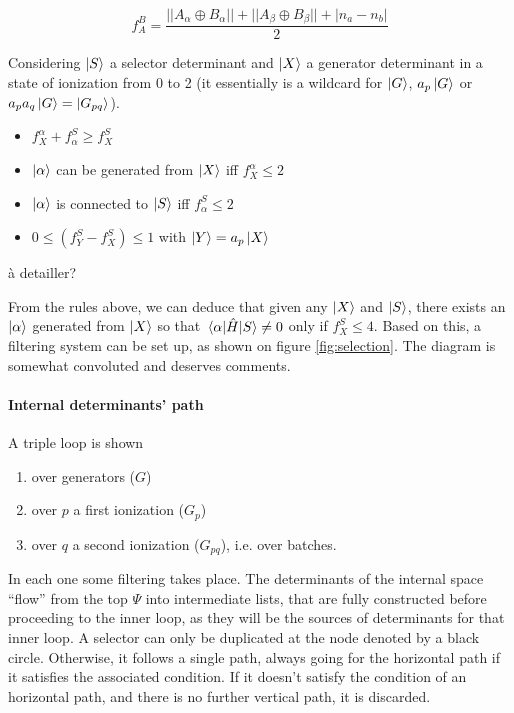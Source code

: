 \documentclass[./thesis.tex]{subfiles}
\begin{document}
\begin{equation}
f_A^B = \frac{||A_\alpha \oplus B_\alpha|| + ||A_\beta \oplus B_\beta|| + |n_a-n_b|}{2}
\end{equation}


Considering $\ket S$ a selector determinant and $\ket X$ a generator determinant in a state of ionization from 0 to 2 (it essentially is a wildcard for $\ket G$, $a_{p} \ket G$ or $a_{p} a_{q} \ket G = \ket {G_{pq}}$).

\begin{itemize}
\item
$f_X^\alpha + f_\alpha^S \geq f_X^S$
\item
$\ket \alpha$ can be generated from $\ket X$ iff $f_X^\alpha \leq 2$
\item
$\ket \alpha$ is connected to $\ket S$ iff $f_\alpha^S \leq 2$
\item
$0 \leq (f_Y^S - f_X^S) \leq 1$ with $\ket Y = a_p \ket X$
\end{itemize}

\alert{à detailler?}

From the rules above, we can deduce that given any $\ket X$ and $\ket S$, there exists an ${\ket{\alpha}}$ generated from $\ket X$ so that $\mel{\alpha}{\hat{H}}{S} \neq 0$ only if $f_X^S \leq 4$.
Based on this, a filtering system can be set up, as shown on figure \ref{fig:selection}. The diagram is somewhat convoluted and deserves comments.

\paragraph{Internal determinants' path}
 
A triple loop is shown

\begin{enumerate}
\item
over generators ($G$)
\item
over $p$ a first ionization ($G_p$)
\item
over $q$ a second ionization ($G_{pq}$), i.e. over batches.
\end{enumerate}

In each one some filtering takes place. The determinants of the internal space ``flow'' from the top $\Psi$ into intermediate lists, that are fully constructed before proceeding to the inner loop, as they will be the sources of determinants for that inner loop.
A selector can only be duplicated at the node denoted by a black circle. Otherwise, it follows a single path, always going for the horizontal path if it satisfies the associated condition.
If it doesn't satisfy the condition of an horizontal path, and there is no further vertical path, it is discarded.
\end{document}
